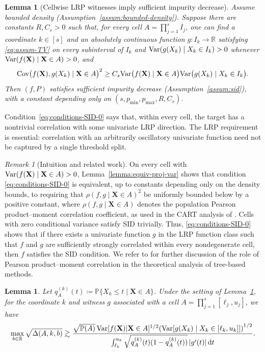 \documentclass[11pt]{article}
\theoremstyle{plain}
\newtheorem{lemma}[theorem]{Lemma}
\theoremstyle{definition}
\theoremstyle{remark}
\newtheorem{remark}[theorem]{Remark}
\theoremstyle{plain}
\newcommand{\bX}{\mathbf{X}}
\DeclarePairedDelimiter{\paren}{(}{)}
\renewcommand{\P}{\mathbb{P}}
\newcommand{\Var}{\textnormal{Var}}
\newcommand{\Cov}{\textnormal{Cov}}
\newcommand{\1}{\mathbbm{1}}
\begin{document}
\begin{lemma}[Cellwise LRP witnesses imply sufficient impurity decrease]
\label{lemma:sufficient-SID}
Assume bounded density (Assumption~\ref{assum:bounded-density}).
Suppose there are constants $R,C_s>0$ such that, for every
cell $A=\prod_{j=1}^s I_j$, one can find a coordinate
$k\in[s]$ and an absolutely continuous function $g\colon I_k\to\mathbb R$
satisfying \eqref{eq:assum-TV} on every subinterval of $I_k$ and
\(
\Var(g(X_k)\mid X_k\in I_k)>0
\)
whenever \(\Var(f(\bX)\mid\bX\in A)>0\), and
\begin{equation}\label{eq:conditions-SID-0}
    \Cov\bigl(f(\bX),g(X_k)\mid\bX\in A\bigr)^2
    \ge
    C_s\Var\bigl(f(\bX)\mid\bX\in A\bigr)
    \Var\bigl(g(X_k)\mid X_k\in I_k\bigr).
\end{equation}
Then $(f,P)$ satisfies sufficient impurity decrease (Assumption~\ref{assum:sid}), with a constant depending only
on $(s,p_{\min},p_{\max},R,C_s)$.
\end{lemma}

Condition~\eqref{eq:conditions-SID-0} says that, within every
cell, the target has a nontrivial correlation with some
univariate LRP direction.  The LRP requirement is essential:
correlation with an arbitrarily oscillatory univariate function
need not be captured by a single threshold split.

\begin{remark}[Intuition and related work]
On every cell with $\Var(f(\bX)\mid\bX\in A)>0$, Lemma~\ref{lemma:equiv-proj-var} shows that condition \eqref{eq:conditions-SID-0} is equivalent, up to constants depending only on the density bounds, to requiring that $\rho(f,g\mid \bX\in A)^2$ be uniformly bounded below by a positive constant,
where $\rho(f,g\mid \bX\in A)$ denotes the population Pearson product--moment correlation coefficient, as used in the CART analysis of \citet{klusowski2020sparse}. Cells with zero conditional variance satisfy SID trivially. Thus, \eqref{eq:conditions-SID-0} shows that if there exists a univariate function $g$ in the LRP function class such that $f$ and $g$ are sufficiently strongly correlated within every nondegenerate cell, then $f$ satisfies the SID condition. We refer to \citet[see, e.g., Lemma A.4]{klusowski2020sparse} for further discussion of the role of Pearson product--moment correlation in the theoretical analysis of tree-based methods.
\end{remark}

\begin{lemma}\label{lemma:help-sufficient-sid}
    Let $q_A^{(k)}(t) \coloneqq \P\{X_k \leq t\mid\bX \in A\}$.
    Under the setting of Lemma~\ref{lemma:sufficient-SID}, for
    the coordinate $k$ and witness $g$ associated with a cell
    $A=\prod_{j=1}^s[\ell_j,u_j]$, we have
    \begin{equation*}
        \max_{ b \in \mathbb{R}} \sqrt{\Delta(A, k, b)} \gtrsim \frac{\sqrt{\P(A)}\,\Var[f(\bX)|\bX \in A]^{1/2}\paren*{\Var[g(X_k) \mid X_k \in [\ell_k,u_k]]}^{1/2}}{\int_{\ell_k}^{u_k} \sqrt{q_A^{(k)}(t)(1 - q_A^{(k)}(t))}\,|g'(t)|\,\mathrm{d}t}.
    \end{equation*}
\end{lemma}
\end{document}

